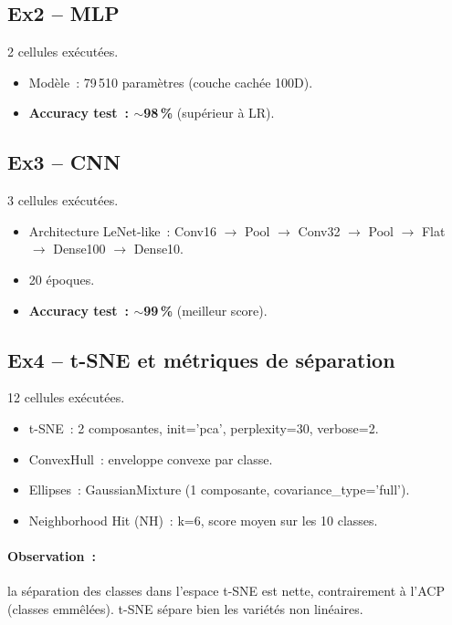 \documentclass[a4paper,11pt]{article}
\begin{document}
\subsection{Ex2 -- MLP}

2 cellules ex\'ecut\'ees.

\begin{itemize}
  \item Mod\`ele~: 79\,510 param\`etres (couche cach\'ee 100D).
  \item \textbf{Accuracy test~: $\sim$98\,\%} (sup\'erieur \`a LR).
\end{itemize}

\subsection{Ex3 -- CNN}

3 cellules ex\'ecut\'ees.

\begin{itemize}
  \item Architecture LeNet-like~: Conv16 $\rightarrow$ Pool
    $\rightarrow$ Conv32 $\rightarrow$ Pool $\rightarrow$ Flat
    $\rightarrow$ Dense100 $\rightarrow$ Dense10.
  \item 20 \'epoques.
  \item \textbf{Accuracy test~: $\sim$99\,\%} (meilleur score).
\end{itemize}

\subsection{Ex4 -- t-SNE et m\'etriques de s\'eparation}

12 cellules ex\'ecut\'ees.

\begin{itemize}
  \item t-SNE~: 2 composantes, init='pca', perplexity=30,
    verbose=2.
  \item ConvexHull~: enveloppe convexe par classe.
  \item Ellipses~: GaussianMixture (1 composante,
    covariance\_type='full').
  \item Neighborhood Hit (NH)~: k=6, score moyen sur les 10
    classes.
\end{itemize}

\paragraph{Observation~:} la s\'eparation des classes dans
l'espace t-SNE est nette, contrairement \`a l'ACP (classes
emm\^el\'ees). t-SNE s\'epare bien les vari\'et\'es non
lin\'eaires.
\end{document}
